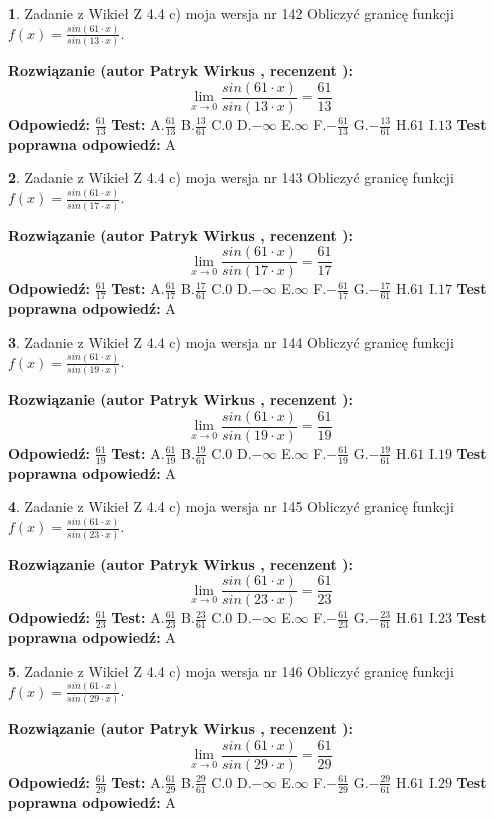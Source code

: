 \documentclass[12pt, a4paper]{article}
\theoremstyle{definition} %
\newtheorem{zad}{}
\newcommand{\zadStart}[1]{\begin{zad}#1\newline}
\newcommand{\zadStop}{\end{zad}}
\newcommand{\rozwStart}[2]{\noindent \textbf{Rozwiązanie (autor #1 , recenzent #2): }\newline}
\newcommand{\rozwStop}{\newline}
\newcommand{\odpStart}{\noindent \textbf{Odpowiedź:}\newline}
\newcommand{\odpStop}{\newline}
\newcommand{\testStart}{\noindent \textbf{Test:}\newline}
\newcommand{\testStop}{\newline}
\newcommand{\kluczStart}{\noindent \textbf{Test poprawna odpowiedź:}\newline}
\newcommand{\kluczStop}{\newline}
\begin{document}
\zadStart{Zadanie z Wikieł Z 4.4 c) moja wersja nr 142}
Obliczyć granicę funkcji $f(x)=\frac{sin(61\cdot x)}{sin(13\cdot x)}$.
\zadStop
\rozwStart{Patryk Wirkus}{}
$$\lim\limits_{x\to 0}\frac{sin(61\cdot x)}{sin(13\cdot x)}=
\frac{61}{13}$$
\rozwStop
\odpStart
$\frac{61}{13}$
\odpStop
\testStart
A.$\frac{61}{13}$
B.$\frac{13}{61}$
C.$0$
D.$-\infty$
E.$\infty$
F.$-\frac{61}{13}$
G.$-\frac{13}{61}$
H.$61$
I.$13$
\testStop
\kluczStart
A
\kluczStop



\zadStart{Zadanie z Wikieł Z 4.4 c) moja wersja nr 143}
Obliczyć granicę funkcji $f(x)=\frac{sin(61\cdot x)}{sin(17\cdot x)}$.
\zadStop
\rozwStart{Patryk Wirkus}{}
$$\lim\limits_{x\to 0}\frac{sin(61\cdot x)}{sin(17\cdot x)}=
\frac{61}{17}$$
\rozwStop
\odpStart
$\frac{61}{17}$
\odpStop
\testStart
A.$\frac{61}{17}$
B.$\frac{17}{61}$
C.$0$
D.$-\infty$
E.$\infty$
F.$-\frac{61}{17}$
G.$-\frac{17}{61}$
H.$61$
I.$17$
\testStop
\kluczStart
A
\kluczStop



\zadStart{Zadanie z Wikieł Z 4.4 c) moja wersja nr 144}
Obliczyć granicę funkcji $f(x)=\frac{sin(61\cdot x)}{sin(19\cdot x)}$.
\zadStop
\rozwStart{Patryk Wirkus}{}
$$\lim\limits_{x\to 0}\frac{sin(61\cdot x)}{sin(19\cdot x)}=
\frac{61}{19}$$
\rozwStop
\odpStart
$\frac{61}{19}$
\odpStop
\testStart
A.$\frac{61}{19}$
B.$\frac{19}{61}$
C.$0$
D.$-\infty$
E.$\infty$
F.$-\frac{61}{19}$
G.$-\frac{19}{61}$
H.$61$
I.$19$
\testStop
\kluczStart
A
\kluczStop



\zadStart{Zadanie z Wikieł Z 4.4 c) moja wersja nr 145}
Obliczyć granicę funkcji $f(x)=\frac{sin(61\cdot x)}{sin(23\cdot x)}$.
\zadStop
\rozwStart{Patryk Wirkus}{}
$$\lim\limits_{x\to 0}\frac{sin(61\cdot x)}{sin(23\cdot x)}=
\frac{61}{23}$$
\rozwStop
\odpStart
$\frac{61}{23}$
\odpStop
\testStart
A.$\frac{61}{23}$
B.$\frac{23}{61}$
C.$0$
D.$-\infty$
E.$\infty$
F.$-\frac{61}{23}$
G.$-\frac{23}{61}$
H.$61$
I.$23$
\testStop
\kluczStart
A
\kluczStop



\zadStart{Zadanie z Wikieł Z 4.4 c) moja wersja nr 146}
Obliczyć granicę funkcji $f(x)=\frac{sin(61\cdot x)}{sin(29\cdot x)}$.
\zadStop
\rozwStart{Patryk Wirkus}{}
$$\lim\limits_{x\to 0}\frac{sin(61\cdot x)}{sin(29\cdot x)}=
\frac{61}{29}$$
\rozwStop
\odpStart
$\frac{61}{29}$
\odpStop
\testStart
A.$\frac{61}{29}$
B.$\frac{29}{61}$
C.$0$
D.$-\infty$
E.$\infty$
F.$-\frac{61}{29}$
G.$-\frac{29}{61}$
H.$61$
I.$29$
\testStop
\kluczStart
A
\kluczStop
\end{document}

